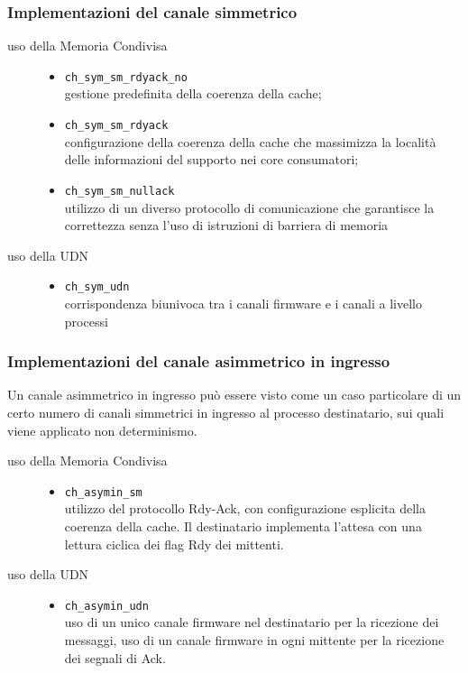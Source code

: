 \documentclass{beamer}
\begin{document}
\begin{frame}[fragile]
  \frametitle{Implementazioni del canale simmetrico}
  \begin{description}
  \item [uso della Memoria Condivisa] \hfill
    \begin{itemize}
    \item \verb+ch_sym_sm_rdyack_no+ \hfill \\
      gestione predefinita della coerenza della cache;
    \item \verb+ch_sym_sm_rdyack+ \hfill \\
      configurazione della coerenza della cache che massimizza la localit\`a delle informazioni del supporto nei core consumatori;
    \item \verb+ch_sym_sm_nullack+ \hfill \\
      utilizzo di un diverso protocollo di comunicazione che garantisce la correttezza senza l'uso di istruzioni di barriera di memoria
    \end{itemize}
  \item [uso della UDN] \hfill
    \begin{itemize}
    \item \verb+ch_sym_udn+ \hfill \\
      corrispondenza biunivoca tra i canali firmware e i canali a livello processi
    \end{itemize}
  \end{description}
\end{frame}

\begin{frame}[fragile]
  \frametitle{Implementazioni del canale asimmetrico in ingresso}
  Un canale asimmetrico in ingresso pu\`o essere visto come un caso particolare di un certo numero di canali simmetrici in ingresso al processo destinatario, sui quali viene applicato non determinismo.
  \begin{description}
  \item [uso della Memoria Condivisa] \hfill
    \begin{itemize}
    \item \verb+ch_asymin_sm+ \hfill \\
      utilizzo del protocollo Rdy-Ack, con configurazione esplicita della coerenza della cache. Il destinatario implementa l'attesa con una lettura ciclica dei flag Rdy dei mittenti.
    \end{itemize}
  \item [uso della UDN] \hfill
    \begin{itemize}
    \item \verb+ch_asymin_udn+ \hfill \\
      uso di un unico canale firmware nel destinatario per la ricezione dei messaggi, uso di un canale firmware in ogni mittente per la ricezione dei segnali di Ack.
    \end{itemize}
  \end{description}
\end{frame}
\end{document}
